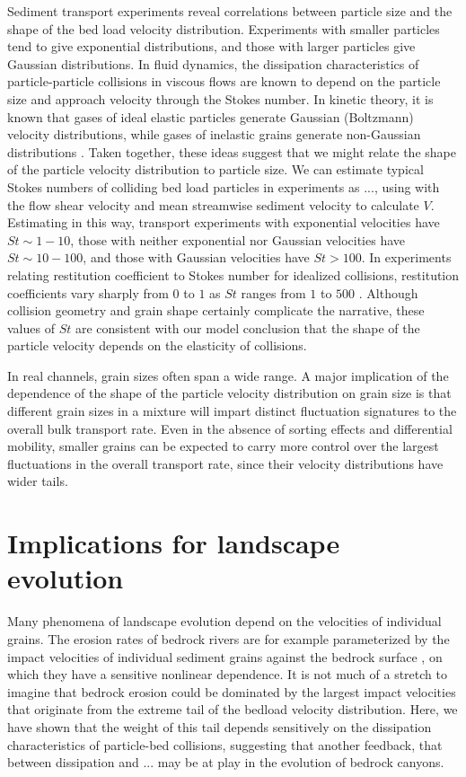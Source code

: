 Sediment transport experiments reveal correlations between particle size and the shape of the bed load velocity distribution.
Experiments with smaller particles tend to give exponential distributions, and those with larger particles give Gaussian distributions.
In fluid dynamics, the dissipation characteristics of particle-particle collisions in viscous flows are known to depend on the particle size and approach velocity through the Stokes number. 
In kinetic theory, it is known that gases of ideal elastic particles generate Gaussian (Boltzmann) velocity distributions, while gases of inelastic grains generate non-Gaussian distributions \citep{Chapman1970,Brilliantov2004}.
Taken together, these ideas suggest that we might relate the shape of the particle velocity distribution to particle size.
We can estimate typical Stokes numbers of colliding bed load particles in experiments as $...$, using with the flow shear velocity and mean streamwise sediment velocity to calculate $V$. Estimating in this way, transport experiments with exponential velocities have $St \sim 1-10$, those with neither exponential nor Gaussian velocities have $St \sim 10-100$, and those with Gaussian velocities have $St > 100$.
In experiments relating restitution coefficient to Stokes number for idealized collisions, restitution coefficients vary sharply from $0$ to $1$ as $St$ ranges from $1$ to $500$ \cite{Marshall2001,Joseph2001,Yang2006}.
Although collision geometry and grain shape certainly complicate the narrative, these values of $St$ are consistent with our model conclusion that the shape of the particle velocity depends on the elasticity of collisions.

In real channels, grain sizes often span a wide range. A major implication of the dependence of the shape of the particle velocity distribution on grain size is that different grain sizes in a mixture will impart distinct fluctuation signatures to the overall bulk transport rate. Even in the absence of sorting effects and differential mobility, smaller grains can be expected to carry more control over the largest fluctuations in the overall transport rate, since their velocity distributions have wider tails. 

\section{Implications for landscape evolution}

Many phenomena of landscape evolution depend on the velocities of individual grains.
The erosion rates of bedrock rivers are for example parameterized by the impact velocities of individual sediment grains against the bedrock surface \citep{Skylar2004,Tingian,Turowski2020}, on which they have a sensitive nonlinear dependence.
It is not much of a stretch to imagine that bedrock erosion could be dominated by the largest impact velocities that originate from the extreme tail of the bedload velocity distribution. Here, we have shown that the weight of this tail depends sensitively on the dissipation characteristics of particle-bed collisions, suggesting that another feedback, that between dissipation and ... may be at play in the evolution of bedrock canyons.

